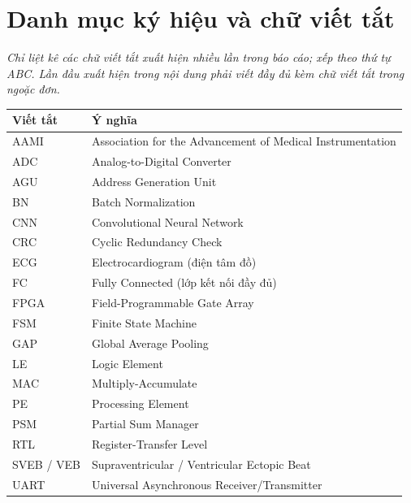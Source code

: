 \chapter*{Danh mục ký hiệu và chữ viết tắt}

\noindent\textit{Chỉ liệt kê các chữ viết tắt xuất hiện nhiều lần trong báo cáo; xếp theo thứ tự ABC. Lần đầu xuất hiện trong nội dung phải viết đầy đủ kèm chữ viết tắt trong ngoặc đơn.}

\begin{longtable}{@{}p{3.2cm}p{11cm}@{}}
\toprule
\textbf{Viết tắt} & \textbf{Ý nghĩa} \\ \midrule
\endhead
AAMI    & Association for the Advancement of Medical Instrumentation \\
ADC     & Analog-to-Digital Converter \\
AGU     & Address Generation Unit \\
BN      & Batch Normalization \\
CNN     & Convolutional Neural Network \\
CRC     & Cyclic Redundancy Check \\
ECG     & Electrocardiogram (điện tâm đồ) \\
FC      & Fully Connected (lớp kết nối đầy đủ) \\
FPGA    & Field-Programmable Gate Array \\
FSM     & Finite State Machine \\
GAP     & Global Average Pooling \\
LE      & Logic Element \\
MAC     & Multiply-Accumulate \\
PE      & Processing Element \\
PSM     & Partial Sum Manager \\
RTL     & Register-Transfer Level \\
SVEB / VEB & Supraventricular / Ventricular Ectopic Beat \\
UART    & Universal Asynchronous Receiver/Transmitter \\
\bottomrule
\end{longtable}
